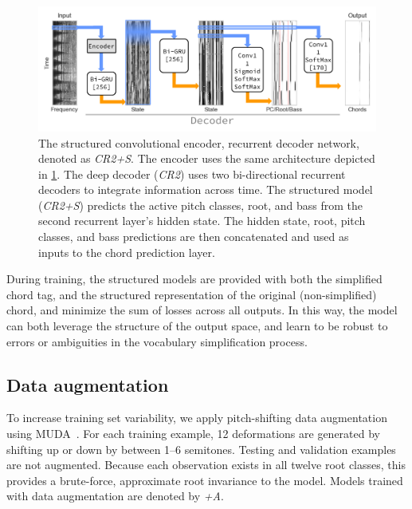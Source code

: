 \documentclass{article}
\begin{document}
\begin{figure}
    \centering
    \includegraphics[width=\columnwidth]{crnn2}
    \caption{The structured convolutional encoder, recurrent decoder network, denoted as \emph{CR2+S}.
    The encoder uses the same architecture depicted in \cref{fig:crnn2}.
    The deep decoder (\emph{CR2}) uses two bi-directional recurrent decoders to integrate information across time.
    The structured model (\emph{CR2+S}) predicts the active pitch classes, root, and bass from the second recurrent layer's hidden state.
    The hidden state, root, pitch classes, and bass predictions are then concatenated and used as inputs to the chord prediction layer.\label{fig:crnn2}}
\end{figure}


During training, the structured models are provided with both the simplified chord tag, and the structured representation of the original (non-simplified) chord, and minimize the sum of losses across all outputs.
In this way, the model can both leverage the structure of the output space, and learn to be robust to errors or ambiguities in the vocabulary simplification process.



\subsection{Data augmentation}
\label{sec:muda}
To increase training set variability, we apply pitch-shifting data augmentation using MUDA~\cite{mcfee2015software}.
For each training example, 12 deformations are generated by shifting up or down by between 1--6 semitones.
Testing and validation examples are not augmented.
Because each observation exists in all twelve root classes, this provides a brute-force, approximate root invariance to the model.
Models trained with data augmentation are denoted by \emph{+A}.
\end{document}
